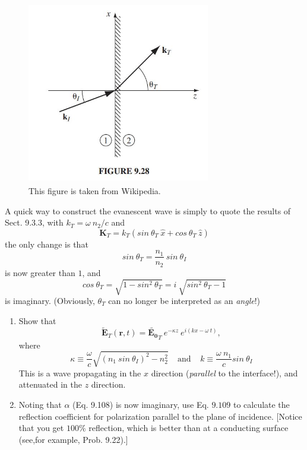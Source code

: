 \documentclass[fleqn]{article}
\begin{document}
\begin{enumerate}
    \begin{figure}[h!]
      \centering
      \includegraphics[height=8cm, width=8cm]{figure9.28.JPG}
      \caption{
        This figure is taken from Wikipedia. 
      }
    \end{figure}

    A quick way to construct the evanescent wave is simply to quote the results of Sect. 9.3.3, with $k_T=\omega ~ n_2/c$ and
    $$
    \mathbf{K}_T=k_T \left(sin ~ \theta_T ~ \hat{x}+cos ~ \theta_T ~ \hat{z}\right)
    $$
    the only change is that 
    $$
      sin ~ \theta_T=\dfrac{n_1}{n_2} ~ sin ~ \theta_I
    $$
    is now greater than $1$, and 
    $$
      cos ~ \theta_T=\sqrt{1-sin^2 ~ \theta_T}=i ~ \sqrt{sin^2 ~ \theta_T-1}
    $$
    is imaginary. (Obviously, $\theta_T$ can no longer be interpreted as an \emph{angle}!)

    \begin{enumerate}
      \item Show that
      $$
        \mathbf{\tilde{E}}_T(\mathbf{r}, t)=\mathbf{\tilde{E_0}}_T ~ e^{-\kappa z} ~ e^{i(kx-\omega ~ t)},
      $$
      where 
      $$
        \kappa \equiv \dfrac{\omega}{c} \sqrt{\left(n_1 ~ sin ~ \theta_I\right)^2-n_2^2} ~~~~~ \text{and} ~~~~~ k \equiv \dfrac{\omega ~ n_1}{c} sin ~ \theta_I 
      $$
      This is a wave propagating in the $x$ direction (\emph{parallel} to the interface!), and attenuated in the $z$ direction.


      \item Noting that $\alpha$ (Eq. 9.108) is now imaginary, use Eq. $9.109$ to calculate the reflection coefficient for polarization 
      parallel to the plane of incidence. [Notice that you get $100\%$ reflection, which is better than at a conducting 
      surface (see,for example, Prob. 9.22).]


\end{enumerate}
\end{enumerate}
\end{document}
